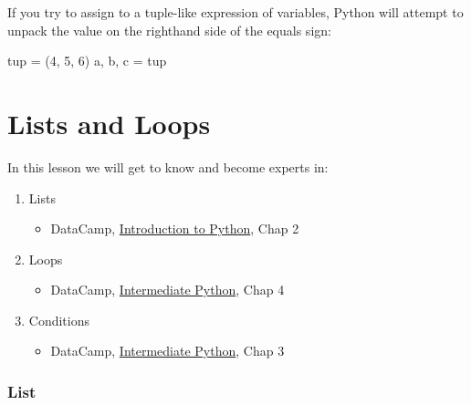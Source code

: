 \documentclass[
  letterpaper,
  DIV=11,
  numbers=noendperiod]{scrreprt}
\newenvironment{Shaded}{\begin{snugshade}}{\end{snugshade}}
\newcommand{\DecValTok}[1]{\textcolor[rgb]{0.68,0.00,0.00}{#1}}
\newcommand{\NormalTok}[1]{\textcolor[rgb]{0.00,0.23,0.31}{#1}}
\newcommand{\OperatorTok}[1]{\textcolor[rgb]{0.37,0.37,0.37}{#1}}
\providecommand{\tightlist}{%
  \setlength{\itemsep}{0pt}\setlength{\parskip}{0pt}}\usepackage{longtable,booktabs,array}
\begin{document}
If you try to assign to a tuple-like expression of variables, Python
will attempt to unpack the value on the righthand side of the equals
sign:

\begin{Shaded}
\begin{Highlighting}[]
\NormalTok{tup }\OperatorTok{=}\NormalTok{ (}\DecValTok{4}\NormalTok{, }\DecValTok{5}\NormalTok{, }\DecValTok{6}\NormalTok{)}
\NormalTok{a, b, c }\OperatorTok{=}\NormalTok{ tup}
\end{Highlighting}
\end{Shaded}


\hypertarget{lists-and-loops}{%
\chapter{Lists and Loops}\label{lists-and-loops}}

In this lesson we will get to know and become experts in:

\begin{enumerate}
\def\labelenumi{\arabic{enumi}.}
\tightlist
\item
  Lists

  \begin{itemize}
  \tightlist
  \item
    DataCamp,
    \href{https://app.datacamp.com/learn/courses/intro-to-python-for-data-science}{Introduction
    to Python}, Chap 2
  \end{itemize}
\item
  Loops

  \begin{itemize}
  \tightlist
  \item
    DataCamp,
    \href{https://campus.datacamp.com/courses/intermediate-python}{Intermediate
    Python}, Chap 4
  \end{itemize}
\item
  Conditions

  \begin{itemize}
  \tightlist
  \item
    DataCamp,
    \href{https://campus.datacamp.com/courses/intermediate-python}{Intermediate
    Python}, Chap 3
  \end{itemize}
\end{enumerate}

\hypertarget{list}{%
\subsection{List}\label{list}}
\end{document}
